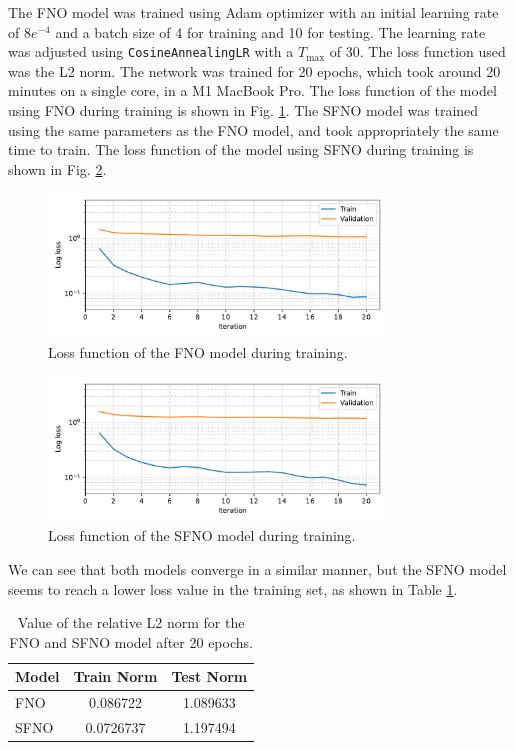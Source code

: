 \documentclass[unicode,11pt,a4paper,oneside,numbers=endperiod,openany]{scrartcl}
\begin{document}
The FNO model was trained using Adam optimizer with an initial learning rate of
$8e^{-4}$ and a batch size of 4 for training and 10 for testing. The learning rate was adjusted using
\texttt{CosineAnnealingLR} with a $T_{\text{max}}$ of 30. 
The loss function used was the L2 norm.
The network was trained for 20 epochs, which took around 20 minutes on a single
core, in a M1 MacBook Pro. 
The loss function of the model using FNO during training is shown in Fig.
\ref{fig:loss_fno2d}.
The SFNO model was trained using the same parameters as the FNO model, and took
appropriately the same time to train. The loss function of the model using SFNO
during training is shown in Fig. \ref{fig:losss_sfno2d}.
\begin{figure}[ht!]
    \centering
    \includegraphics[width=0.8\textwidth]{../task2/sfno/loss_function_FNO2d.pdf}
    \caption{Loss function of the FNO model during training.}
    \label{fig:loss_fno2d}
\end{figure}
\begin{figure}[ht!]
    \centering
    \includegraphics[width=0.8\textwidth]{../task2/sfno/loss_function_SFNO2d.pdf}
    \caption{Loss function of the SFNO model during training.}
    \label{fig:losss_sfno2d}
\end{figure}
We can see that both models converge in a similar manner, but the SFNO
model seems to reach a lower loss value in the training set, as shown in Table
\ref{tab:evaluation_metrics}.
\begin{table}[ht!]
    \centering
    \begin{tabular}{lcc}
        \hline
        \textbf{Model} & \textbf{Train Norm} & \textbf{Test Norm} \\
        \hline
        FNO & 0.086722 & 1.089633 \\
        SFNO & 0.0726737  & 1.197494 \\
        \hline
    \end{tabular}
    \caption{Value of the relative L2 norm for the FNO and SFNO model after 20 epochs.}
    \label{tab:evaluation_metrics}
\end{table}
\end{document}
